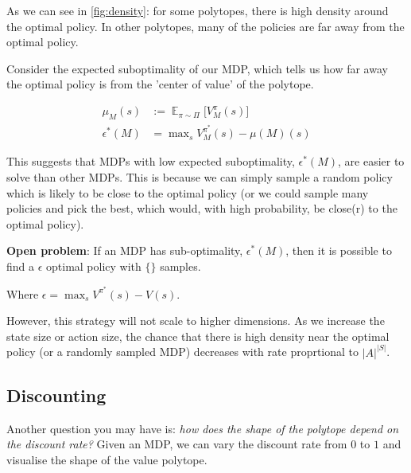 As we can see in \ref{fig:density}: for some polytopes, there is high density around the optimal policy.
In other polytopes, many of the policies are far away from the optimal policy.

Consider the expected suboptimality of our MDP, which tells us how far away the
optimal policy is from the 'center of value' of the polytope.

\begin{align*}
\mu_M(s) &:= \mathop{\mathbb E}_{\pi\sim\Pi}\Big[V_M^{\pi}(s) \Big]\\
\epsilon^{* }(M) &= \mathop{\text{max}}_s V_M^{\pi^{* }}(s) - \mu(M)(s)
\end{align*}

This suggests that MDPs with low expected suboptimality, $\epsilon^{* }(M)$, are easier to solve than other MDPs.
This is because we can simply sample a random policy which is likely to be close to the optimal policy
(or we could sample many policies and pick the best, which would, with high probability, be close(r) to the optimal policy).

\vspace{5mm}

\textbf{Open problem}\footnotemark[15]: If an MDP has sub-optimality,  $\epsilon^{* }(M)$,
then it is possible to find a $\epsilon$ optimal policy with $\{\}$ samples.


Where $\epsilon = \mathop{\text{max}}_s V^{\pi^{* }}(s) - V(s)$.

\vspace{5mm}

However, this strategy will not scale to higher dimensions.
As we increase the state size or action size, the chance that there is high
density near the optimal policy (or a randomly sampled MDP) decreases with rate proprtional to $|A|^{|S|}$.


\subsection{Discounting}

Another question you may have is: \textit{how does the shape of the polytope depend on the discount rate?}
Given an MDP, we can vary the discount rate from \(0\) to \(1\) and visualise
the shape of the value polytope.

